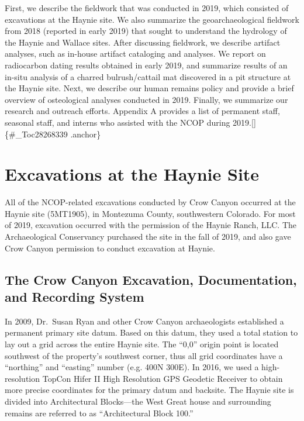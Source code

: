 \documentclass[
  12pt,
]{krantz}
\begin{document}
First, we describe the fieldwork that was conducted in 2019, which
consisted of excavations at the Haynie site. We also summarize the
geoarchaeological fieldwork from 2018 (reported in early 2019) that
sought to understand the hydrology of the Haynie and Wallace sites.
After discussing fieldwork, we describe artifact analyses, such as
in-house artifact cataloging and analyses. We report on radiocarbon
dating results obtained in early 2019, and summarize results of an
in-situ analysis of a charred bulrush/cattail mat discovered in a pit
structure at the Haynie site. Next, we describe our human remains policy
and provide a brief overview of osteological analyses conducted in 2019.
Finally, we summarize our research and outreach efforts. Appendix A
provides a list of permanent staff, seasonal staff, and interns who
assisted with the NCOP during 2019.{[}{]}\{\#\_Toc28268339 .anchor\}

\hypertarget{excavations-at-the-haynie-site}{%
\chapter{Excavations at the Haynie Site}\label{excavations-at-the-haynie-site}}

All of the NCOP-related excavations conducted by Crow Canyon occurred at
the Haynie site (5MT1905), in Montezuma County, southwestern Colorado.
For most of 2019, excavation occurred with the permission of the Haynie
Ranch, LLC. The Archaeological Conservancy purchased the site in the
fall of 2019, and also gave Crow Canyon permission to conduct excavation
at Haynie.

\hypertarget{the-crow-canyon-excavation-documentation-and-recording-system}{%
\section{The Crow Canyon Excavation, Documentation, and Recording System}\label{the-crow-canyon-excavation-documentation-and-recording-system}}

In 2009, Dr.~Susan Ryan and other Crow Canyon archaeologists established
a permanent primary site datum. Based on this datum, they used a total
station to lay out a grid across the entire Haynie site. The ``0,0''
origin point is located southwest of the property's southwest corner,
thus all grid coordinates have a ``northing'' and ``easting'' number (e.g.
400N 300E). In 2016, we used a high-resolution TopCon Hifer II High
Resolution GPS Geodetic Receiver to obtain more precise coordinates for
the primary datum and backsite. The Haynie site is divided into
Architectural Blocks---the West Great house and surrounding remains are
referred to as ``Architectural Block 100.''
\end{document}
